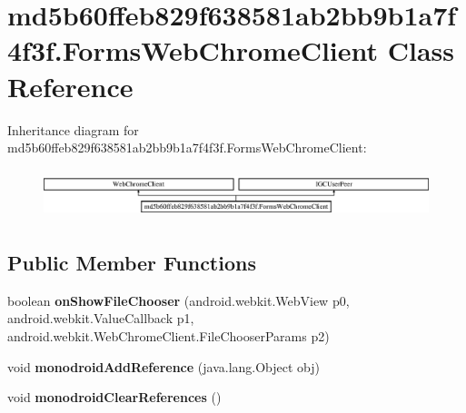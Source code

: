 \hypertarget{classmd5b60ffeb829f638581ab2bb9b1a7f4f3f_1_1FormsWebChromeClient}{}\section{md5b60ffeb829f638581ab2bb9b1a7f4f3f.\+Forms\+Web\+Chrome\+Client Class Reference}
\label{classmd5b60ffeb829f638581ab2bb9b1a7f4f3f_1_1FormsWebChromeClient}
Inheritance diagram for md5b60ffeb829f638581ab2bb9b1a7f4f3f.\+Forms\+Web\+Chrome\+Client\+:\begin{figure}[H]
\begin{center}
\leavevmode
\includegraphics[height=1.439589cm]{classmd5b60ffeb829f638581ab2bb9b1a7f4f3f_1_1FormsWebChromeClient}
\end{center}
\end{figure}
\subsection*{Public Member Functions}
\begin{DoxyCompactItemize}
\item 
\mbox{\label{classmd5b60ffeb829f638581ab2bb9b1a7f4f3f_1_1FormsWebChromeClient_a870ec31fb8f8d9e959487609161690fc}} 
boolean {\bfseries on\+Show\+File\+Chooser} (android.\+webkit.\+Web\+View p0, android.\+webkit.\+Value\+Callback p1, android.\+webkit.\+Web\+Chrome\+Client.\+File\+Chooser\+Params p2)
\item 
\mbox{\label{classmd5b60ffeb829f638581ab2bb9b1a7f4f3f_1_1FormsWebChromeClient_a9a31a7d0228c24952476bc4cfc6e78df}} 
void {\bfseries monodroid\+Add\+Reference} (java.\+lang.\+Object obj)
\item 
\mbox{\label{classmd5b60ffeb829f638581ab2bb9b1a7f4f3f_1_1FormsWebChromeClient_ae810253c0c2adc00084f02ce56257c9c}} 
void {\bfseries monodroid\+Clear\+References} ()
\end{DoxyCompactItemize}
